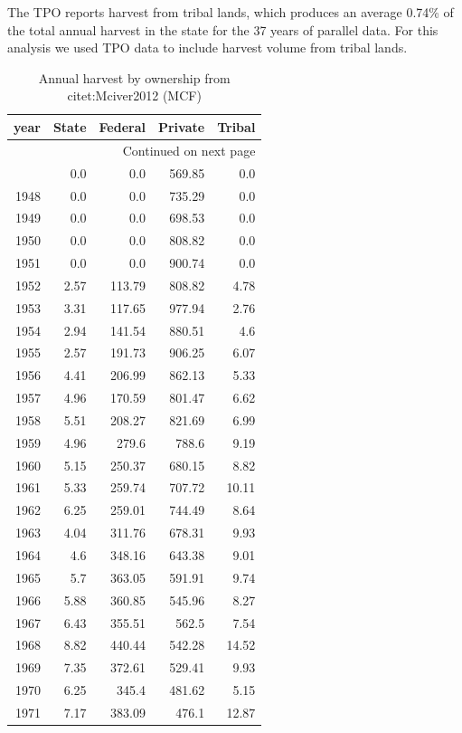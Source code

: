 \documentclass[a4paper]{article}
\begin{document}
The TPO reports harvest from tribal lands, which produces an average 0.74\% of the total
annual harvest in the state for the 37 years of parallel data. For
this analysis we used TPO data to include harvest volume from tribal lands. 


\begin{longtable}{rrrrr}
\caption{Annual harvest by ownership from citet:Mciver2012 (MCF)}
\\
year & State & Federal & Private & Tribal\\
\hline
\endhead
\hline\multicolumn{5}{r}{Continued on next page} \\
\endfoot
\endlastfoot
1947 & 0.0 & 0.0 & 569.85 & 0.0\\
1948 & 0.0 & 0.0 & 735.29 & 0.0\\
1949 & 0.0 & 0.0 & 698.53 & 0.0\\
1950 & 0.0 & 0.0 & 808.82 & 0.0\\
1951 & 0.0 & 0.0 & 900.74 & 0.0\\
1952 & 2.57 & 113.79 & 808.82 & 4.78\\
1953 & 3.31 & 117.65 & 977.94 & 2.76\\
1954 & 2.94 & 141.54 & 880.51 & 4.6\\
1955 & 2.57 & 191.73 & 906.25 & 6.07\\
1956 & 4.41 & 206.99 & 862.13 & 5.33\\
1957 & 4.96 & 170.59 & 801.47 & 6.62\\
1958 & 5.51 & 208.27 & 821.69 & 6.99\\
1959 & 4.96 & 279.6 & 788.6 & 9.19\\
1960 & 5.15 & 250.37 & 680.15 & 8.82\\
1961 & 5.33 & 259.74 & 707.72 & 10.11\\
1962 & 6.25 & 259.01 & 744.49 & 8.64\\
1963 & 4.04 & 311.76 & 678.31 & 9.93\\
1964 & 4.6 & 348.16 & 643.38 & 9.01\\
1965 & 5.7 & 363.05 & 591.91 & 9.74\\
1966 & 5.88 & 360.85 & 545.96 & 8.27\\
1967 & 6.43 & 355.51 & 562.5 & 7.54\\
1968 & 8.82 & 440.44 & 542.28 & 14.52\\
1969 & 7.35 & 372.61 & 529.41 & 9.93\\
1970 & 6.25 & 345.4 & 481.62 & 5.15\\
1971 & 7.17 & 383.09 & 476.1 & 12.87\\

\end{longtable}
\end{document}
